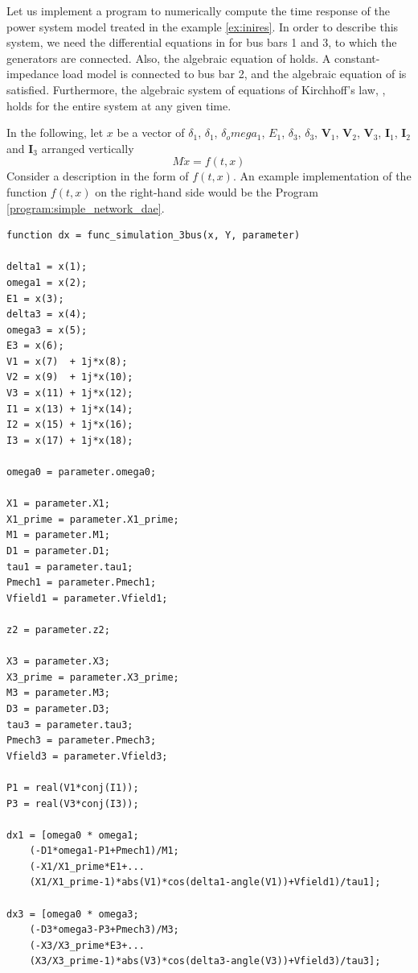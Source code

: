 \documentclass[tombow,dvipdfmx]{corona-a5-1.1}
\begin{document}
\begin{例}\label{ex:dae_ex2}
Let us implement a program to numerically compute the time response of the power system model treated in the example \ref{ex:inires}.
In order to describe this system, we need the differential equations in  for bus bars 1 and 3, to which the generators are connected.
Also, the algebraic equation of  holds. A constant-impedance load model is connected to bus bar 2, and the algebraic equation of  is satisfied.
Furthermore, the algebraic system of equations of Kirchhoff's law, , holds for the entire system at any given time.

In the following, let $x$ be a vector of $\delta_1$, $\delta_1$, $\delta_omega_1$, $E_1$, $\delta_3$, $\delta_3$, $\bm V_1$, $\bm V_2$, $\bm V_3$, $\bm I_1$, $\bm I_2$ and $\bm I_3$ arranged vertically
\[
M\dot{x} = f(t, x)
\]
Consider a description in the form of $f(t, x)$.
An example implementation of the function $f(t, x)$ on the right-hand side would be the Program \ref{program:simple_network_dae}.

\smallskip
\begin{PROGRAMA}[count,title={func\_simulation\_3bus.m}]\label{program:simple_network_dae}
\begin{verbatim}
function dx = func_simulation_3bus(x, Y, parameter)

delta1 = x(1);
omega1 = x(2);
E1 = x(3);
delta3 = x(4);
omega3 = x(5);
E3 = x(6);
V1 = x(7)  + 1j*x(8);
V2 = x(9)  + 1j*x(10);
V3 = x(11) + 1j*x(12);
I1 = x(13) + 1j*x(14);
I2 = x(15) + 1j*x(16);
I3 = x(17) + 1j*x(18);

omega0 = parameter.omega0;

X1 = parameter.X1;
X1_prime = parameter.X1_prime;
M1 = parameter.M1;
D1 = parameter.D1;
tau1 = parameter.tau1;
Pmech1 = parameter.Pmech1;
Vfield1 = parameter.Vfield1;

z2 = parameter.z2;

X3 = parameter.X3;
X3_prime = parameter.X3_prime;
M3 = parameter.M3;
D3 = parameter.D3;
tau3 = parameter.tau3;
Pmech3 = parameter.Pmech3;
Vfield3 = parameter.Vfield3;

P1 = real(V1*conj(I1));
P3 = real(V3*conj(I3));

dx1 = [omega0 * omega1;
    (-D1*omega1-P1+Pmech1)/M1;
    (-X1/X1_prime*E1+...
    (X1/X1_prime-1)*abs(V1)*cos(delta1-angle(V1))+Vfield1)/tau1];

dx3 = [omega0 * omega3;
    (-D3*omega3-P3+Pmech3)/M3;
    (-X3/X3_prime*E3+...
    (X3/X3_prime-1)*abs(V3)*cos(delta3-angle(V3))+Vfield3)/tau3];


\end{verbatim}
\end{PROGRAMA}
\end{例}
\end{document}
